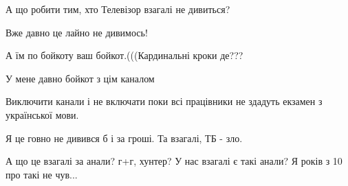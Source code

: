 \begin{itemize}
 
А що робити тим, хто Телевізор взагалі не дивиться?

 
Вже давно це лайно не дивимось!

 
А їм по бойкоту ваш бойкот.(((Кардинальні кроки де???

 
У мене давно бойкот з цім каналом

 
Виключити канали і не включати поки всі працівники не здадуть екзамен з української мови.

 
Я це говно не дивився б і за гроші. Та взагалі, ТБ - зло.

 
А що це взагалі за анали? г+г, хунтер? У нас взагалі є такі анали? Я років з 10 про такі не чув...


\end{itemize}
